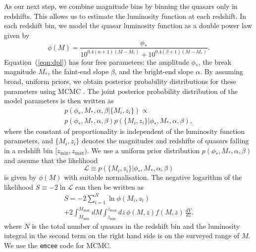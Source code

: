 \documentclass[a4paper,fleqn,usenatbib]{mnras}
\begin{document}
As our next step, we combine magnitude bins by binning the quasars
only in redshifts.  This allows us to estimate the luminosity function
at each redshift.  In each redshift bin, we model the quasar
luminosity function as a double power law given by
\citep{1988MNRAS.235..935B, 1995ApJ...438..623P, 2000MNRAS.317.1014B}
\begin{equation}
  \phi(M) =
  \frac{\phi_*}{10^{0.4(\alpha+1)(M-M_*)}+10^{0.4(\beta+1)(M-M_*)}}.
  \label{eqn:dpl}
\end{equation}
Equation~(\ref{eqn:dpl}) has four free parameters: the amplitude
$\phi_*$, the break magnitude $M_*$, the faint-end slope $\beta$, and
the bright-end slope $\alpha$.  By assuming broad, uniform priors, we
obtain posterior probability distributions for these parameters using
MCMC \citep[e.g.,][]{jaynes}.  The joint posterior probability
distribution of the model parameters is then written as
\begin{multline}
  p(\phi_*, M_*, \alpha, \beta | \{M_i, z_i\}) \propto \\ p(\phi_*, M_*,
  \alpha, \beta)p(\{M_i, z_i\} | \phi_*, M_*, \alpha, \beta),
\end{multline}
where the constant of proportionality is independent of the luminosity
function parameters, and $\{M_i, z_i\}$ denotes the magnitudes and
redshifts of quasars falling in a redshift bin $[z_\mathrm{min},
  z_\mathrm{max})$.  We use a uniform prior distribution $p(\phi_*,
  M_*, \alpha, \beta)$ and assume that the likelihood
\begin{equation}
  \mathcal{L}\equiv p(\{M_i, z_i\} | \phi_*, M_*, \alpha, \beta)
\end{equation}
is given by $\phi(M)$ with suitable normalisation.  The negative
logarithm of the likelihood $S\equiv -2\ln\mathcal{L}$ can then be
written as
\begin{multline}
  S = -2\sum_{i=1}^N\ln\phi(M_i, z_i)\\+2\int_{M_\mathrm{min}}^{M_\mathrm{max}}dM
  \int_{z_\mathrm{min}}^{z_\mathrm{max}}dz\, \phi(M,z) f(M, z)\,\frac{dV}{dz}.
  \label{eqn:S}
\end{multline}
where $N$ is the total number of quasars in the redshift bin and the
luminosity integral in the second term on the right hand side is on
the surveyed range of $M$.  We use the \texttt{emcee} code
\citep{2013PASP..125..306F} for MCMC.
\end{document}
